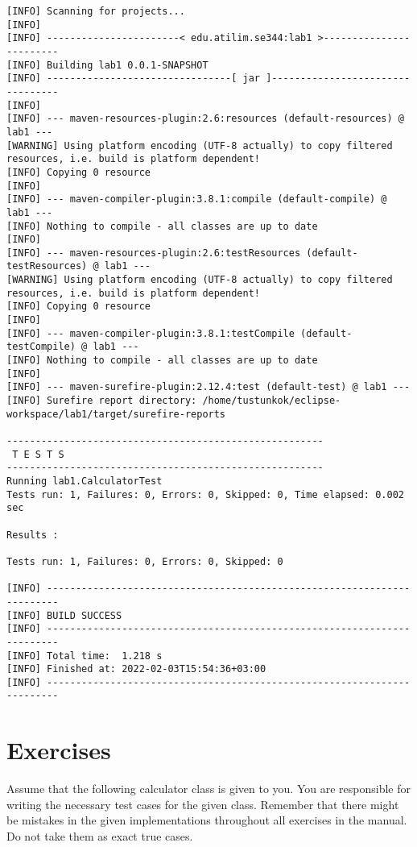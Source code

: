 \begin{minipage}{\textwidth}
    \begin{lstlisting}[language={},caption={A log output from a Maven test run.}]
[INFO] Scanning for projects...
[INFO] 
[INFO] -----------------------< edu.atilim.se344:lab1 >------------------------
[INFO] Building lab1 0.0.1-SNAPSHOT
[INFO] --------------------------------[ jar ]---------------------------------
[INFO] 
[INFO] --- maven-resources-plugin:2.6:resources (default-resources) @ lab1 ---
[WARNING] Using platform encoding (UTF-8 actually) to copy filtered resources, i.e. build is platform dependent!
[INFO] Copying 0 resource
[INFO] 
[INFO] --- maven-compiler-plugin:3.8.1:compile (default-compile) @ lab1 ---
[INFO] Nothing to compile - all classes are up to date
[INFO] 
[INFO] --- maven-resources-plugin:2.6:testResources (default-testResources) @ lab1 ---
[WARNING] Using platform encoding (UTF-8 actually) to copy filtered resources, i.e. build is platform dependent!
[INFO] Copying 0 resource
[INFO] 
[INFO] --- maven-compiler-plugin:3.8.1:testCompile (default-testCompile) @ lab1 ---
[INFO] Nothing to compile - all classes are up to date
[INFO] 
[INFO] --- maven-surefire-plugin:2.12.4:test (default-test) @ lab1 ---
[INFO] Surefire report directory: /home/tustunkok/eclipse-workspace/lab1/target/surefire-reports

-------------------------------------------------------
 T E S T S
-------------------------------------------------------
Running lab1.CalculatorTest
Tests run: 1, Failures: 0, Errors: 0, Skipped: 0, Time elapsed: 0.002 sec

Results :

Tests run: 1, Failures: 0, Errors: 0, Skipped: 0

[INFO] ------------------------------------------------------------------------
[INFO] BUILD SUCCESS
[INFO] ------------------------------------------------------------------------
[INFO] Total time:  1.218 s
[INFO] Finished at: 2022-02-03T15:54:36+03:00
[INFO] ------------------------------------------------------------------------
    \end{lstlisting}
\end{minipage}

\section{Exercises}
Assume that the following calculator class is given to you. You are responsible for writing the necessary test cases for the given class. Remember that there might be mistakes in the given implementations throughout all exercises in the manual. Do not take them as exact true cases.

